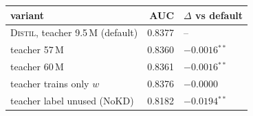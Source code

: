 \begin{tabular}{l r@{\hskip 1.4em} l}
\toprule
variant & AUC & $\Delta$ vs default\\
\midrule
\textsc{Distil}, teacher 9.5\,M (default) & 0.8377 & --\\
\quad teacher 57\,M & 0.8360 & $-0.0016$$^{\ast\ast}$\\
\quad teacher 60\,M & 0.8361 & $-0.0016$$^{\ast\ast}$\\
\quad teacher trains only $w$ & 0.8376 & $-0.0000$\\
\quad teacher label unused (NoKD) & 0.8182 & $-0.0194$$^{\ast\ast}$\\
\bottomrule
\end{tabular}
